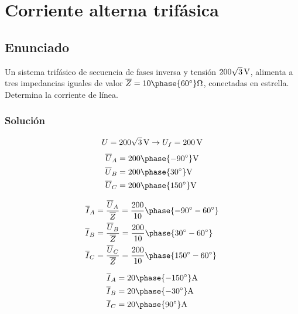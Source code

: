 \chapter{Corriente alterna trifásica}

\section{Enunciado}

Un sistema trifásico de secuencia de fases inversa y tensión
$\SI[parse-numbers=false]{200\sqrt{3}}{\volt}$, alimenta a tres
impedancias iguales de valor
$\overline{Z} = 10\phase{\ang{60}}\unit{\ohm}$,
conectadas en estrella. Determina la corriente de línea.

\subsection*{Solución}

\[ U = \SI[parse-numbers=false]{200\sqrt{3}}{\volt} \rightarrow U_f =
  \SI{200}{\volt}
\]
\begin{align*}
  \overline{U}_A &=
                   {200\phase{\ang{-90}}}\unit{\volt}\\
  \overline{U}_B
                 &= {200\phase{\ang{30}}}\unit{\volt}\\
  \overline{U}_C &=
                   {200\phase{\ang{150}}}\unit{\volt}\\
\end{align*}

\begin{align*}
  \overline{I}_A &= \frac{\overline{U}_A}{\overline{Z}} =
                   \frac{200}{10}\phase{\ang{-90} - \ang{60}} \\
  \overline{I}_B &=
  \frac{\overline{U}_B}{\overline{Z}} = \frac{200}{10}\phase{\ang{30}
                   - \ang{60}}\\
  \overline{I}_C &=
  \frac{\overline{U}_C}{\overline{Z}} = \frac{200}{10}\phase{\ang{150}
    - \ang{60}}
\end{align*}

\begin{align*}
  \overline{I}_A &=
                   {20\phase{\ang{-150}}}\unit{\ampere}\\
  \overline{I}_B &=
                   {20\phase{\ang{-30}}}\unit{\ampere}\\
  \overline{I}_C &=
                   {20\phase{\ang{90}}}\unit{\ampere}
\end{align*}

